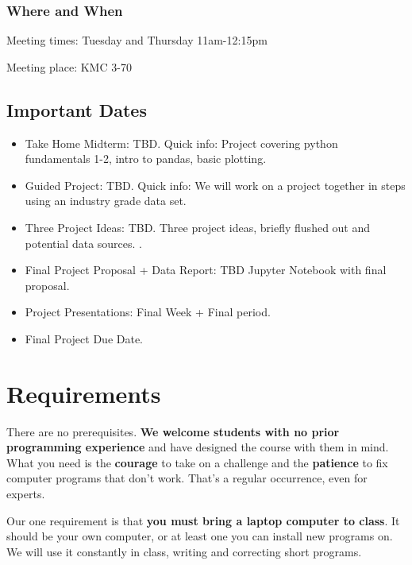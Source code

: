 \subsubsection*{Where and When}
Meeting times: Tuesday and Thursday 11am-12:15pm

Meeting place: KMC 3-70

\subsection*{Important Dates}

\begin{itemize}

\item Take Home Midterm: TBD. Quick info: Project covering python fundamentals 1-2, intro to pandas, basic plotting.

\item Guided Project: TBD. Quick info: We will work on a project together in steps using an industry grade data set.

\item Three Project Ideas: TBD. Three project ideas, briefly flushed out and potential data sources. .

\item Final Project Proposal + Data Report: TBD Jupyter Notebook with final proposal. 

\item Project Presentations: Final Week + Final period.

\item Final Project Due Date.

\end{itemize}

\section*{Requirements}

There are no prerequisites.
{\bf We welcome students with no prior programming experience\/}
and have designed the course with them in mind.
What you need is the {\bf courage\/} to take on a challenge
and the {\bf patience\/} to fix computer programs that don't work.
That's a regular occurrence, even for experts.

Our one requirement is that {\bf you must bring a laptop computer to class\/}.
It should be your own computer, or at least one you can install new programs on.
We will use it constantly in class, writing and correcting short programs.


